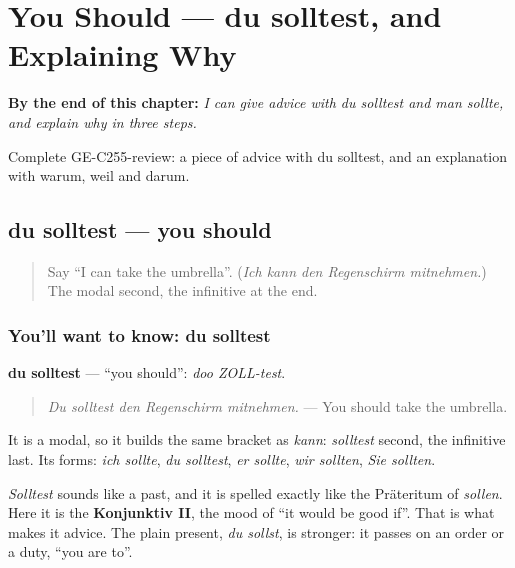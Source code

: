 
\chapter{You Should — du solltest, and Explaining Why}
\label{ch:ge-you-should}

\begin{chapteropening}
\textbf{By the end of this chapter:} \emph{I can give advice with du solltest and man sollte, and explain why in three steps.}

Complete GE-C255-review: a piece of advice with du solltest, and an explanation with warum, weil and darum.
\end{chapteropening}

\section[du solltest / man sollte]{du solltest — you should}

\label{lesson:GE-C255-du-solltest}



\begin{quote}
Say \textquotedblleft{}I can take the umbrella\textquotedblright{}. (\emph{Ich kann den Regenschirm mitnehmen.}) The modal second, the infinitive at the end.
\end{quote}

\subsection*{You'll want to know: du solltest}
\textbf{du solltest} — \textquotedblleft{}you should\textquotedblright{}: \emph{doo ZOLL-test}.

\begin{quote}
\emph{Du solltest den Regenschirm mitnehmen.} — You should take the umbrella.
\end{quote}

It is a modal, so it builds the same bracket as \emph{kann}: \emph{solltest} second, the infinitive last. Its forms: \emph{ich sollte}, \emph{du solltest}, \emph{er sollte}, \emph{wir sollten}, \emph{Sie sollten}.

\emph{Solltest} sounds like a past, and it is spelled exactly like the Präteritum of \emph{sollen}. Here it is the \textbf{Konjunktiv II}, the mood of \textquotedblleft{}it would be good if\textquotedblright{}. That is what makes it advice. The plain present, \emph{du sollst}, is stronger: it passes on an order or a duty, \textquotedblleft{}you are to\textquotedblright{}.

